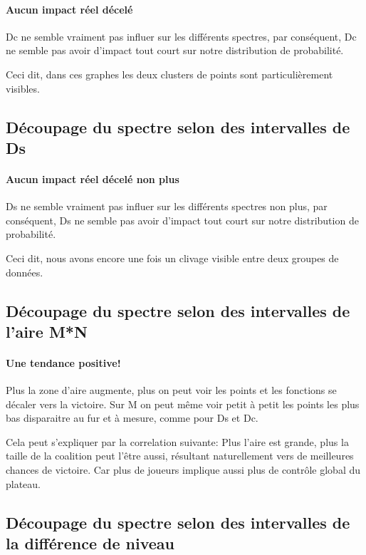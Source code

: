 \paragraph{Aucun impact réel décelé}
Dc ne semble vraiment pas influer sur les différents spectres, par conséquent, Dc ne semble pas avoir d'impact tout court sur notre distribution de probabilité.


Ceci dit, dans ces graphes les deux clusters de points sont particulièrement visibles.

\subsection{Découpage du spectre selon des intervalles de Ds}
\paragraph{Aucun impact réel décelé non plus}
Ds ne semble vraiment pas influer sur les différents spectres non plus, par conséquent, Ds ne semble pas avoir d'impact tout court sur notre distribution de probabilité.


Ceci dit, nous avons encore une fois un clivage visible entre deux groupes de données.

\subsection{Découpage du spectre selon des intervalles de l'aire M*N}
\paragraph{Une tendance positive!}
Plus la zone d'aire augmente, plus on peut voir les points et les fonctions se décaler vers la victoire.
Sur M on peut même voir petit à petit les points les plus bas disparaitre au fur et à mesure, comme pour Ds et Dc. 

\begin{info}
	Cela peut s'expliquer par la correlation suivante: Plus l'aire est grande, plus la taille de la coalition peut l'être aussi, résultant naturellement vers de meilleures chances de victoire. Car plus de joueurs implique aussi plus de contrôle global du plateau.
\end{info}



\subsection{Découpage du spectre selon des intervalles de la différence de niveau}

